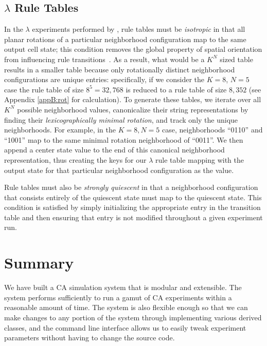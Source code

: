\documentclass[a4paper,11pt]{report}
\begin{document}
\subsection{$\lambda$ Rule Tables}
\label{subsec:ch3_lamb}
In the $\lambda$ experiments performed by \citeauthor{wo90}, rule tables must be \textit{isotropic} in that all planar rotations of a particular neighborhood configuration map to the same output cell state; this condition removes the global property of spatial orientation from influencing rule transitions~\cite{av00,wo90}. As a result, what would be a $K^N$ sized table results in a smaller table because only rotationally distinct neighborhood configurations are unique entries: specifically, if we consider the $K=8$, $N=5$ case the rule table of size $8^5 = 32,768$ is reduced to a rule table of size $8,352$ (see Appendix \ref{appB:rot} for calculation). To generate these tables, we iterate over all $K^N$ possible neighborhood values, canonicalize their string representations by finding their \textit{lexicographically minimal rotation}, and track only the unique neighborhoods. For example, in the $K=8, N=5$ case, neighborhoods ``0110'' and ``1001'' map to the same minimal rotation neighborhood of ``0011''. We then append a center state value to the end of this canonical neighborhood representation, thus creating the keys for our $\lambda$ rule table mapping with the output state for that particular neighborhood configuration as the value.

Rule tables must also be \textit{strongly quiescent} in that a neighborhood configuration that consists entirely of the quiescent state must map to the quiescent state. This condition is satisfied by simply initializing the appropriate entry in the transition table and then ensuring that entry is not modified throughout a given experiment run.

\section{Summary}
We have built a CA simulation system that is modular and extensible. The system performs sufficiently to run a gamut of CA experiments within a reasonable amount of time. The system is also flexible enough so that we can make changes to any portion of the system through implementing various derived classes, and the command line interface allows us to easily tweak experiment parameters without having to change the source code.
\end{document}

